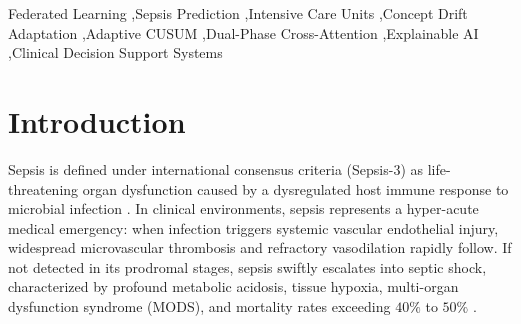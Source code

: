 \documentclass[final,5p,times,twocolumn]{elsarticle}
\begin{document}
\begin{frontmatter}
\begin{abstract}
0.7820--0.8026), highest AUPRC of \textbf{0.1043}, lowest ECE of \textbf{0.0902}, and lowest Brier score of \textbf{0.0548}. Paired cluster bootstrap testing confirms statistically equivalent discrimination to centralized BiLSTM ($P = .176$) and personalized Ditto ($P = .459$) while delivering superior probability reliability. Depending on clinical deployment requirements, FPDAF supports flexible operating modes, ranging from an \textbf{Early Bedside Screening mode} ($\tau=0.08$, Sensitivity 80.15\%, Specificity 63.85\%) to a \textbf{High-Confidence Rule-In mode} ($\tau=0.65$, Accuracy 96.20\%, Specificity 97.80\%). In a theoretical 50-round deployment model, CSSP achieves up to 38.0\% communication savings (1.52~GB vs. 2.48~GB in Ditto), while empirical 6-round logs demonstrated a 0.38\% reduction during selective freeze rounds. Paired with an operational point-of-care Clinical Decision Support System (CDSS) providing temporal window attributions, physiological feature saliency via Integrated Gradients, and counterfactual intervention simulation with a cohort mean early warning lead time of \textbf{4.98 hours} (up to 5.8 hours in exemplar cases), FPDAF provides an empirically grounded, privacy-preserving foundation for decentralized early sepsis surveillance.
\end{abstract}

\begin{keyword}
Federated Learning \sep Sepsis Prediction \sep Intensive Care Units \sep Concept Drift Adaptation \sep Adaptive CUSUM \sep Dual-Phase Cross-Attention \sep Explainable AI \sep Clinical Decision Support Systems
\end{keyword}

\end{frontmatter}

\section{Introduction}
Sepsis is defined under international consensus criteria (Sepsis-3) as life-threatening organ dysfunction caused by a dysregulated host immune response to microbial infection \cite{singer2016sepsis3}. In clinical environments, sepsis represents a hyper-acute medical emergency: when infection triggers systemic vascular endothelial injury, widespread microvascular thrombosis and refractory vasodilation rapidly follow. If not detected in its prodromal stages, sepsis swiftly escalates into septic shock, characterized by profound metabolic acidosis, tissue hypoxia, multi-organ dysfunction syndrome (MODS), and mortality rates exceeding $40\%$ to $50\%$ \cite{evans2021surviving,dusing2025sepsis}. 
\end{document}
